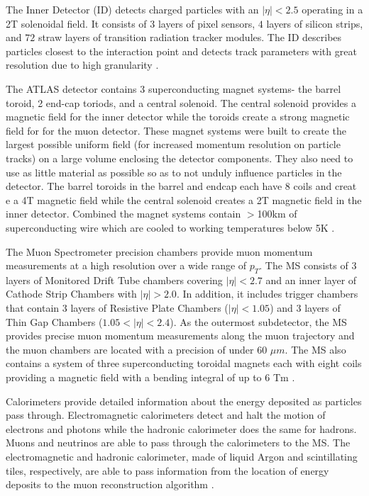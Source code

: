 \par \hspace{20pt} The Inner Detector (ID) detects charged particles with an $|\eta| < 2.5$ operating in a 2T solenoidal field. It consists of $3$ layers of pixel sensors, $4$ layers of silicon strips, and $72$ straw layers of transition radiation tracker modules. The ID describes particles closest to the interaction point and detects track parameters with great resolution due to high granularity \cite{detector}. 

The ATLAS detector contains 3 superconducting magnet systems- the barrel toroid, 2 end-cap toriods, and a central solenoid. The central solenoid provides a magnetic field for the inner detector while the toroids create a strong magnetic field for for the muon detector. These magnet systems were built to create the largest possible uniform field (for increased momentum resolution on particle tracks) on a large volume enclosing the detector components. They also need to use as little material as possible so as to not unduly influence particles in the detector. The barrel toroids in the barrel and endcap each have 8 coils and creat e a 4T magnetic field while the central solenoid creates a 2T magnetic field in the inner detector. Combined the magnet systems contain $>$100km of superconducting wire which are cooled to working temperatures below 5K \cite{detector}. 

The Muon Spectrometer precision chambers provide muon momentum measurements at a high resolution over a wide range of $p_T$. The MS consists of $3$ layers of Monitored Drift Tube chambers covering $|\eta| < 2.7$ and an inner layer of Cathode Strip Chambers with $|\eta| > 2.0$. In addition, it includes trigger chambers that contain $3$ layers of Resistive Plate Chambers ($|\eta| < 1.05$) and $3$ layers of Thin Gap Chambers ($1.05 < |\eta| < 2.4$). As the outermost subdetector, the MS provides precise muon momentum measurements along the muon trajectory and the muon chambers are located with a precision of under $60$ $\mu m$. The MS also contains a system of three superconducting toroidal magnets each with eight coils providing a magnetic field with a bending integral of up to $6$ Tm \cite{detector}. 

Calorimeters provide detailed information about the energy deposited as particles pass through. Electromagnetic calorimeters detect and halt the motion of electrons and photons while the hadronic calorimeter does the same for hadrons. Muons and neutrinos are able to pass through the calorimeters to the MS. The electromagnetic and hadronic calorimeter, made of liquid Argon and scintillating tiles, respectively, are able to pass information from the location of energy deposits to the muon reconstruction algorithm \cite{detector}. 

